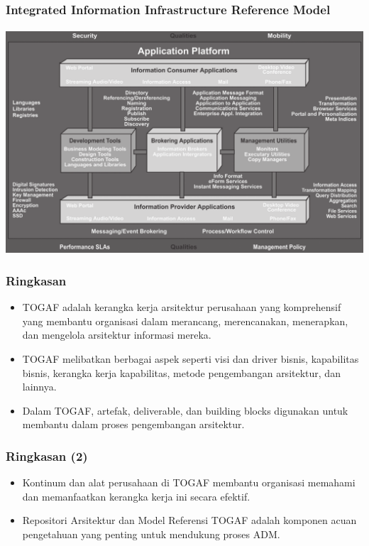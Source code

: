 \documentclass[aspectratio=169, table]{beamer}
\begin{document}
	{
		\begin{frame}
			\frametitle{Integrated Information Infrastructure Reference Model}
			\framesubtitle{\hspace{1cm}}
			\begin{center}
				\includegraphics[width=.90\textwidth]{../figures/integrated_information_infrastructure_reference_model}
			\end{center}
		\end{frame}
	}

	\begin{frame}
		\frametitle{Ringkasan}
		\begin{itemize}
			\item TOGAF adalah kerangka kerja arsitektur perusahaan yang komprehensif yang membantu organisasi dalam merancang, merencanakan, menerapkan, dan mengelola arsitektur informasi mereka.
			\item TOGAF melibatkan berbagai aspek seperti visi dan driver bisnis, kapabilitas bisnis, kerangka kerja kapabilitas, metode pengembangan arsitektur, dan lainnya.
			\item Dalam TOGAF, artefak, deliverable, dan building blocks digunakan untuk membantu dalam proses pengembangan arsitektur.
		\end{itemize}
	\end{frame}

		\begin{frame}
		\frametitle{Ringkasan (2)}
		\begin{itemize}
			\item Kontinum dan alat perusahaan di TOGAF membantu organisasi memahami dan memanfaatkan kerangka kerja ini secara efektif.
			\item Repositori Arsitektur dan Model Referensi TOGAF adalah komponen acuan pengetahuan yang penting untuk mendukung proses ADM.
		\end{itemize}
	\end{frame}
\end{document}
